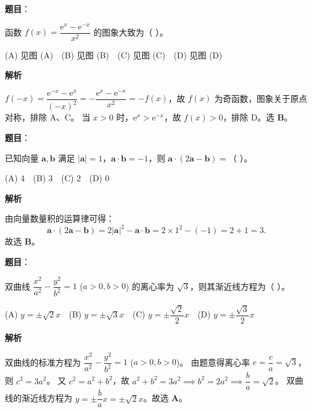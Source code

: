 \begin{answer}

\textbf{题目}：

函数 $f(x)=\dfrac{\mathrm e^x-\mathrm e^{-x}}{x^2}$ 的图象大致为（ ）。
\nopagebreak[4]
\begin{center}\end{center}
\nopagebreak[4]
(A) 见图 (A)　(B) 见图 (B)　(C) 见图 (C)　(D) 见图 (D)

\textbf{解析}

$f(-x) = \dfrac{\mathrm e^{-x}-\mathrm e^x}{(-x)^2} = -\dfrac{\mathrm e^x-\mathrm e^{-x}}{x^2} = -f(x)$，故 $f(x)$ 为奇函数，图象关于原点对称，排除 A、C。
当 $x>0$ 时，$\mathrm e^x>\mathrm e^{-x}$，故 $f(x)>0$，排除 D。选 \textbf{B}。


\end{answer}
\begin{answer}

\textbf{题目}：

已知向量 $\boldsymbol a, \boldsymbol b$ 满足 $|\boldsymbol a|=1$，$\boldsymbol a\cdot\boldsymbol b=-1$，则 $\boldsymbol a\cdot(2\boldsymbol a-\boldsymbol b)=$（ ）。

(A) 4　(B) 3　(C) 2　(D) 0

\textbf{解析}

由向量数量积的运算律可得：
\nopagebreak[4]
\[\boldsymbol a\cdot(2\boldsymbol a-\boldsymbol b) = 2|\boldsymbol a|^2 - \boldsymbol a\cdot\boldsymbol b = 2\times 1^2 - (-1) = 2 + 1 = 3.\]
故选 \textbf{B}。


\end{answer}
\begin{answer}

\textbf{题目}：

双曲线 $\dfrac{x^2}{a^2}-\dfrac{y^2}{b^2}=1$ ($a>0, b>0$) 的离心率为 $\sqrt3$，则其渐近线方程为（ ）。

(A) $y=\pm\sqrt2 x$　(B) $y=\pm\sqrt3 x$　(C) $y=\pm\dfrac{\sqrt2}{2}x$　(D) $y=\pm\dfrac{\sqrt3}{2}x$

\textbf{解析}

双曲线的标准方程为 $\dfrac{x^2}{a^2}-\dfrac{y^2}{b^2}=1$ ($a>0, b>0$)。
由题意得离心率 $e = \dfrac ca = \sqrt3$，则 $c^2 = 3a^2$。
又 $c^2 = a^2+b^2$，故 $a^2+b^2 = 3a^2 \implies b^2 = 2a^2 \implies \dfrac ba = \sqrt2$。
双曲线的渐近线方程为 $y = \pm\dfrac ba x = \pm\sqrt2 x$。故选 \textbf{A}。


\end{answer}
